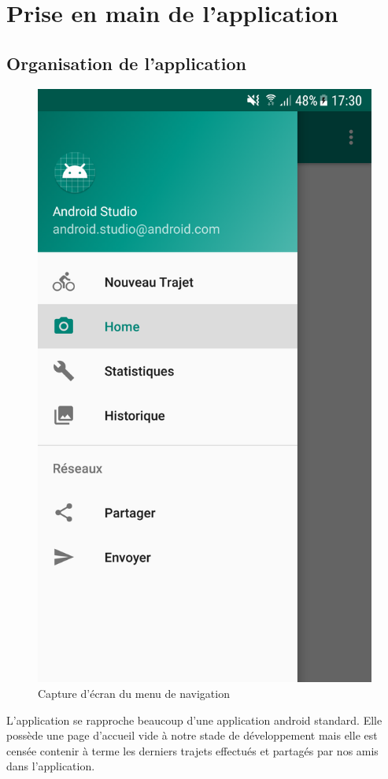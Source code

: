 \section{Prise en main de l'application}
\subsection{Organisation de l'application}
\begin{figure}
  \vspace{-50pt}
  \label{Menu de navigation}
  \centering
  \includegraphics[scale=0.13]{images/navigation-menu.png}
  \caption{Capture d'écran du menu de navigation}
\end{figure}
L'application se rapproche beaucoup d'une application android standard. Elle possède une page d'accueil vide à notre stade de développement mais
elle est censée contenir à terme les derniers trajets effectués et partagés par nos amis dans l'application.

